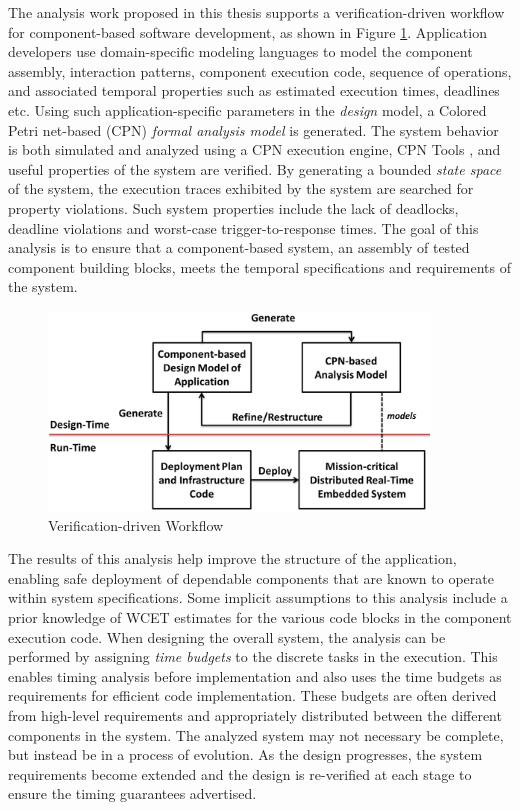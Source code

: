 The analysis work proposed in this thesis supports a verification-driven workflow for component-based software development, as shown in Figure \ref{fig:big_picture}. Application developers use domain-specific modeling languages to model the component assembly, interaction patterns, component execution code, sequence of operations, and associated temporal properties such as estimated execution times, deadlines etc. Using such application-specific parameters in the \textit{design} model, a Colored Petri net-based (CPN) \cite{CPN} \textit{formal analysis model} is generated. The system behavior is both simulated and analyzed using a CPN execution engine, CPN Tools \cite{CPNTools}, and useful properties of the system are verified. By generating a bounded \emph{state space} of the system, the execution traces exhibited by the system are searched for property violations. Such system properties include the lack of deadlocks, deadline violations and worst-case trigger-to-response times. The goal of this analysis is to ensure that a component-based system, an assembly of tested component building blocks, meets the temporal specifications and requirements of the system.  

\begin{figure}[h]
	\centering
	\includegraphics[width=0.9\textwidth]{./figs/big_picture}
	\caption{Verification-driven Workflow}
	\label{fig:big_picture}
\end{figure}

The results of this analysis help improve the structure of the application, enabling safe deployment of dependable components that are known to operate within system specifications. Some implicit assumptions to this analysis include a prior knowledge of WCET estimates for the various code blocks in the component execution code. When designing the overall system, the analysis can be performed by assigning \emph{time budgets} to the discrete tasks in the execution. This enables timing analysis before implementation and also uses the time budgets as requirements for efficient code implementation. These budgets are often derived from high-level requirements and appropriately distributed between the different components in the system. The analyzed system may not necessary be complete, but instead be in a process of evolution. As the design progresses, the system requirements become extended and the design is re-verified at each stage to ensure the timing guarantees advertised. 

